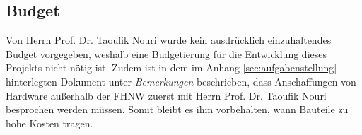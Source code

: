 \subsection{Budget}
Von Herrn Prof. Dr. Taoufik Nouri wurde kein ausdrücklich einzuhaltendes Budget vorgegeben, weshalb eine Budgetierung für die Entwicklung dieses Projekts nicht nötig ist. Zudem ist in dem im Anhang \ref{sec:aufgabenstellung} hinterlegten Dokument unter \textit{Bemerkungen} beschrieben, dass Anschaffungen von Hardware außerhalb der FHNW zuerst mit Herrn Prof. Dr. Taoufik Nouri besprochen werden müssen. Somit bleibt es ihm vorbehalten, wann Bauteile zu hohe Kosten tragen.\\


